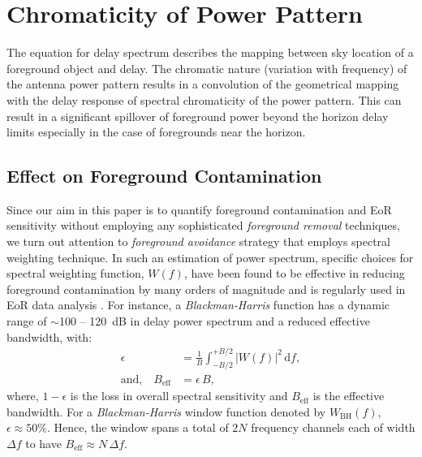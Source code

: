 \documentclass[preprint2,iop,numberedappendix,twocolappendix,appendixfloats]{emulateapj}
\newcommand{\dif}{\mathrm{d}}
\begin{document}
\section{Chromaticity of Power Pattern}\label{sec:beam-chromaticity}

The equation for delay spectrum describes the mapping between sky location of a foreground object and delay. The chromatic nature (variation with frequency) of the antenna power pattern results in a convolution of the geometrical mapping with the delay response of spectral chromaticity of the power pattern. This can result in a significant spillover of foreground power beyond the horizon delay limits especially in the case of foregrounds near the horizon. 

\subsection{Effect on Foreground Contamination}\label{sec:effects-fgdps}

Since our aim in this paper is to quantify foreground contamination and EoR sensitivity without employing any sophisticated {\it foreground removal} techniques, we turn out attention to {\it foreground avoidance} strategy that employs spectral weighting technique. In such an estimation of power spectrum, specific choices for spectral weighting function, $W(f)$, have been found to be effective in reducing foreground contamination by many orders of magnitude \citep{thy13} and is regularly used in EoR data analysis \citep{par12a}. For instance, a {\it Blackman-Harris} function \citep{har78} has a dynamic range of $\sim$100 -- 120~dB in delay power spectrum and a reduced effective bandwidth, with:
\begin{align}\label{eqn:Beff}
  \epsilon &= \frac{1}{B} \int_{-B/2}^{+B/2} |W(f)|^2\,\dif f, \\
  \textrm{and,}\quad B_\textrm{eff} &= \epsilon\,B,
\end{align}
where, $1-\epsilon$ is the loss in overall spectral sensitivity and $B_\textrm{eff}$ is the effective bandwidth. For a {\it Blackman-Harris} window function denoted by $W_\textrm{BH}(f)$, $\epsilon \approx 50\%$. Hence, the window spans a total of $2N$ frequency channels each of width $\Delta f$ to have $B_\textrm{eff} \approx N\,\Delta f$.
\end{document}
